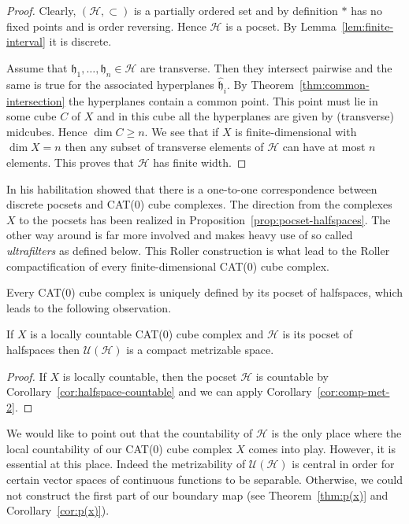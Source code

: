 \begin{proof}
  Clearly, \((\mathcal{H}, \subset)\) is a partially ordered set and by definition \(\ast\) has no fixed points and is order reversing. Hence \(\mathcal{H}\) is a pocset. By Lemma~\ref{lem:finite-interval} it is discrete.

  Assume that \(\mathfrak{h}_1, \dots, \mathfrak{h}_n \in \mathcal{H}\) are transverse. Then they intersect pairwise and the same is true for the associated hyperplanes \(\mathfrak{\hat h}_i\). By Theorem~\ref{thm:common-intersection} the hyperplanes contain a common point. This point must lie in some cube \(C\) of \(X\) and in this cube all the hyperplanes are given by (transverse) midcubes. Hence \(\dim C \geq n\). We see that if \(X\) is finite-dimensional with \(\dim X = n\) then any subset of transverse elements of \(\mathcal{H}\) can have at most \(n\) elements. This proves that \(\mathcal{H}\) has finite width.
\end{proof}

\begin{rem}
  \label{rem:roller}
  In his habilitation \textcite{Roller1999} showed that there is a one-to-one correspondence between discrete pocsets and CAT(0) cube complexes. The direction from the complexes \(X\) to the pocsets has been realized in Proposition~\ref{prop:pocset-halfspaces}. The other way around is far more involved and makes heavy use of so called \emph{ultrafilters} as defined below. This Roller construction is what lead to the Roller compactification of every finite-dimensional CAT(0) cube complex.

  Every CAT(0) cube complex is uniquely defined by its pocset of halfspaces, which leads to the following observation.
\end{rem}

\begin{cor}
  \label{cor:comp-met}
  If \(X\) is a locally countable CAT(0) cube complex and \(\mathcal{H}\) is its pocset of halfspaces then \(\mathcal{U}(\mathcal{H})\) is a compact metrizable space.
\end{cor}

\begin{proof}
  If \(X\) is locally countable, then the pocset \(\mathcal{H}\) is countable by Corollary~\ref{cor:halfspace-countable} and we can apply Corollary~\ref{cor:comp-met-2}.
\end{proof}

\begin{rem}
  We would like to point out that the countability of \(\mathcal{H}\) is the only place where the local countability of our CAT(0) cube complex \(X\) comes into play. However, it is essential at this place. Indeed the metrizability of \(\mathcal{U}(\mathcal{H})\) is central in order for certain vector spaces of continuous functions to be separable. Otherwise, we could not construct the first part of our boundary map (see Theorem~\ref{thm:p(x)} and Corollary~\ref{cor:p(x)}).
\end{rem}

